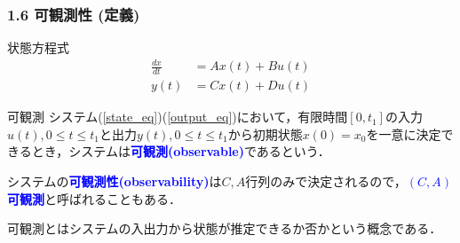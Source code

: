 \documentclass[10pt]{beamer}
\begin{document}
\begin{frame}[t]
\frametitle{1.6 可観測性 (定義)}
状態方程式
\begin{align}
 \frac{dx}{dt} &= A x(t) + B u(t)  \\
 y(t) &= C x(t) + D u(t) 
\end{align}
\begin{block}{可観測}
システム(\ref{state_eq})(\ref{output_eq})において，有限時間$[0,t_1]$の入力$u(t),0 \leq t \leq t_1$と出力$y(t), 0 \leq t \leq t_1$から初期状態$x(0)=x_0$を一意に決定できるとき，システムは\textcolor{blue}{\bf 可観測(observable)}であるという．
\end{block}

システムの\textcolor{blue}{\bf 可観測性(observability)}は$C,A$行列のみで決定されるので，\textcolor{blue}{\bf $(C,A)$可観測}と呼ばれることもある．

可観測とはシステムの入出力から状態が推定できるか否かという概念である．
\end{frame}
\end{document}
